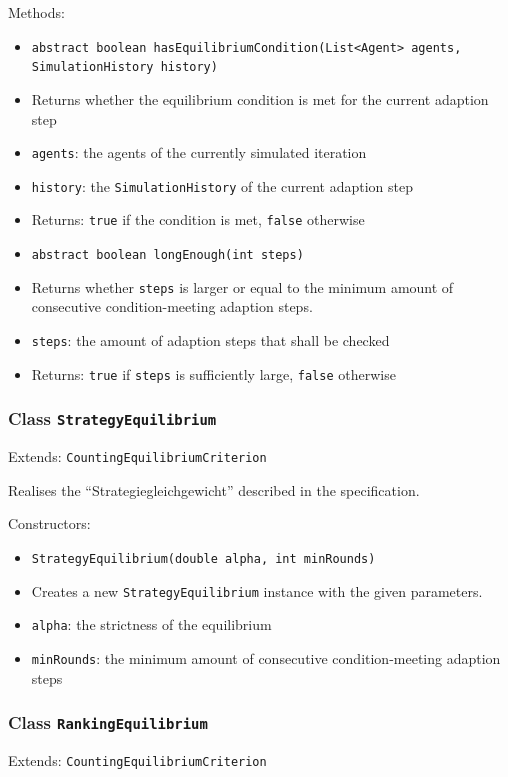 \documentclass[parskip=full,11pt]{scrartcl}
\begin{document}
Methods:
\begin{itemize}\itemsep -10pt
\item \texttt{abstract boolean hasEquilibriumCondition(List<Agent> agents, SimulationHistory history)}
\item[] Returns whether the equilibrium condition is met for the current adaption step
\item[] \texttt{agents}: the agents of the currently simulated iteration
\item[] \texttt{history}: the \texttt{SimulationHistory} of the current adaption step
\item[] Returns: \texttt{true} if the condition is met, \texttt{false} otherwise

\item \texttt{abstract boolean longEnough(int steps)}
\item[] Returns whether \texttt{steps} is larger or equal to the minimum amount of consecutive condition-meeting adaption steps.
\item[] \texttt{steps}: the amount of adaption steps that shall be checked
\item[] Returns: \texttt{true} if \texttt{steps} is sufficiently large, \texttt{false} otherwise
\end{itemize}

\subsubsection{Class \texttt{StrategyEquilibrium}}
Extends: \texttt{CountingEquilibriumCriterion}

Realises the \enquote{Strategiegleichgewicht} described in the specification.

Constructors:
\begin{itemize}\itemsep -10pt
\item \texttt{StrategyEquilibrium(double alpha, int minRounds)}
\item[] Creates a new \texttt{StrategyEquilibrium} instance with the given parameters.
\item[] \texttt{alpha}: the strictness of the equilibrium
\item[] \texttt{minRounds}: the minimum amount of consecutive condition-meeting adaption steps
\end{itemize}

\subsubsection{Class \texttt{RankingEquilibrium}}
Extends: \texttt{CountingEquilibriumCriterion}
\end{document}

